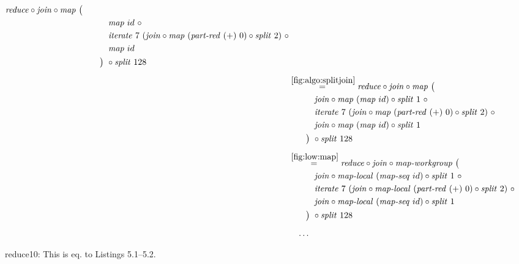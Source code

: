 \begin{figure*}[t]
\begin{align*}
\begin{aligned}
      \reduce \circ \join \circ \map\ \big(\\
    &\qquad\quad\map\ id\ \circ \\
    &\qquad\quad\iterateN\ 7\ (\join \circ \map\ (\partRed\ (+)\ 0) \circ \splitN\ 2)\ \circ\\
    &\qquad\quad\map\ id\\
    &\qquad\big)\ \circ \splitN\ 128
  \end{aligned}\\[.5em]
%
  &\hspace{-2em}\quad\begin{aligned}
    &\overset{\ref{fig:algo:splitjoin}}{=\hspace{.2em}}
      \reduce \circ \join \circ \map\ \big(\\
    &\qquad\quad\join \circ \map\ (\map\ id) \circ \splitN\ 1\ \circ\\
    &\qquad\quad\iterateN\ 7\ (\join \circ \map\ (\partRed\ (+)\ 0) \circ \splitN\ 2)\ \circ\\
    &\qquad\quad\join \circ \map\ (\map\ id) \circ \splitN\ 1\\
    &\qquad\big)\ \circ \splitN\ 128
  \end{aligned}\\[.5em]
%
  &\hspace{-2em}\quad\begin{aligned}
    &\overset{\ref{fig:low:map}}{=\hspace{.2em}}
      \reduce \circ \join \circ \mapWorkgroup\ \big(\\
    &\qquad\quad\join \circ \mapLocal\ (\mapSeq\ id) \circ \splitN\ 1\ \circ\\
    &\qquad\quad\iterateN\ 7\ (\join \circ \mapLocal\ (\partRed\ (+)\ 0) \circ \splitN\ 2)\ \circ\\
    &\qquad\quad\join \circ \mapLocal\ (\mapSeq\ id) \circ \splitN\ 1\\
    &\qquad\big)\ \circ \splitN\ 128
  \end{aligned}\\[.5em]
%
  &\ldots
\end{align*}
\caption{reduce10: This is eq. to Listings 5.1--5.2.}
\end{figure*}

